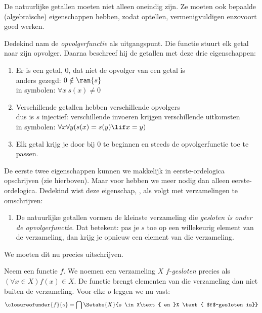 \documentclass[../../../include/open-logic-section]{subfiles}
\begin{document}

De natuurlijke getallen moeten niet alleen oneindig zijn. Ze moeten ook
bepaalde (algebraïsche) eigenschappen hebben, zodat optellen,
vermenigvuldigen enzovoort goed werken.

Dedekind nam de \emph{opvolgerfunctie} als uitgangspunt. Die functie
stuurt elk getal naar zijn opvolger. Daarna beschreef hij de getallen
met deze drie eigenschappen:
\begin{enumerate}
	\item Er is een getal, $0$, dat niet de opvolger van een getal is
	\\anders gezegd: $0 \notin \ran{s}$
	\\in symbolen: $\forall x\ s(x) \neq 0$
	\item Verschillende getallen hebben verschillende opvolgers
	\\dus is $s$ injectief: verschillende invoeren krijgen verschillende uitkomsten
	\\in symbolen: $\forall x \forall y (s(x) = s(y) \lif x = y)$
	\item{} Elk getal krijg je door bij $0$ te
	beginnen en steeds de opvolgerfunctie toe te passen.
\end{enumerate}
De eerste twee eigenschappen kunnen we makkelijk in eerste-ordelogica
opschrijven (zie hierboven). Maar voor 
hebben we meer nodig dan alleen eerste-ordelogica. Dedekind wist deze
eigenschap, , als volgt met verzamelingen te
omschrijven:
\begin{enumerate}
	\item[3$'$.] De natuurlijke getallen vormen de kleinste verzameling
	die \emph{gesloten is onder de opvolgerfunctie}. Dat betekent: pas je
	$s$ toe op een willekeurig element van de verzameling, dan krijg je
	opnieuw een element van die verzameling.
\end{enumerate}
We moeten dit nu precies uitschrijven.

\begin{defn}
	Neem een functie $f$. We noemen een verzameling $X$ $f$-\emph{gesloten}
	{precies als} $(\forall x \in X)f(x) \in X$. De functie brengt
	elementen van die verzameling dan niet buiten de verzameling. Voor
	elke $o$ leggen we nu vast:
	$$\closureofunder{f}{o} = \bigcap\Setabs{X}{o \in X\text{ en }X
\text{ $f$-gesloten is}}$$
\end{defn}
\end{document}
